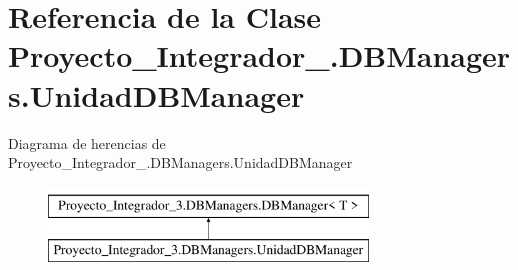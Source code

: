\hypertarget{class_proyecto___integrador__3_1_1_d_b_managers_1_1_unidad_d_b_manager}{\section{Referencia de la Clase Proyecto\-\_\-\-Integrador\-\_.\-D\-B\-Managers.\-Unidad\-D\-B\-Manager}
\label{class_proyecto___integrador__3_1_1_d_b_managers_1_1_unidad_d_b_manager}
}
Diagrama de herencias de Proyecto\-\_\-\-Integrador\-\_.\-D\-B\-Managers.\-Unidad\-D\-B\-Manager\begin{figure}[H]
\begin{center}
\leavevmode
\includegraphics[height=2.000000cm]{class_proyecto___integrador__3_1_1_d_b_managers_1_1_unidad_d_b_manager}
\end{center}
\end{figure}
